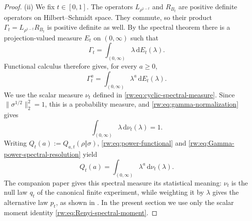 \documentclass[11pt]{article}
\theoremstyle{remark}
\newcommand{\1}{\mathbbm{1}}
\begin{document}
\begin{proof}
\noindent (ii) We fix $t\in[0,1]$.  The operators
$L_{\rho^{1-t}}$ and $R_{B_t}$ are positive definite operators on
Hilbert--Schmidt space.  They commute, so their product
$\Gamma_t=L_{\rho^{1-t}}R_{B_t}$ is positive definite as well.  By
the spectral theorem there is a projection-valued measure $E_t$ on
$(0,\infty)$ such that
\begin{equation}
 \Gamma_t=\int_{(0,\infty)}\lambda\,\mathrm dE_t(\lambda).
 \label{rw:eq:Gamma-spectral-resolution}
\end{equation}
Functional calculus therefore gives, for every $a\geq0$,
\begin{equation}
 \Gamma_t^a
 =\int_{(0,\infty)}\lambda^a\,\mathrm dE_t(\lambda).
 \label{rw:eq:Gamma-power-spectral-resolution}
\end{equation}
We use the scalar measure $\nu_t$ defined in
\eqref{rw:eq:cyclic-spectral-measure}.  Since
$\lVert\sigma^{1/2}\rVert_2^2=1$, this is a probability measure, and
\eqref{rw:eq:gamma-normalization} gives
\begin{equation}
 \int_{(0,\infty)}\lambda\,\mathrm d\nu_t(\lambda)=1.
 \label{rw:eq:cyclic-spectral-first-moment}
\end{equation}
Writing $Q_t(a):=Q_{a,t}(\rho\Vert\sigma)$,
\eqref{rw:eq:power-functional} and
\eqref{rw:eq:Gamma-power-spectral-resolution} yield
\begin{equation}
Q_t(a)=\int_{(0,\infty)}\lambda^a\,
 \mathrm d\nu_t(\lambda).
 \label{rw:eq:Renyi-spectral-moment}
\end{equation}
The companion paper gives this spectral measure its statistical
meaning: $\nu_t$ is the null law $q_t$ of the canonical finite
experiment, while weighting it by $\lambda$ gives the alternative law
$p_t$, as shown in \cite[Theorem~3.1]{capel2026informationgeometry}.  In the
present section we use only the scalar moment identity
\eqref{rw:eq:Renyi-spectral-moment}.


\end{proof}
\end{document}
